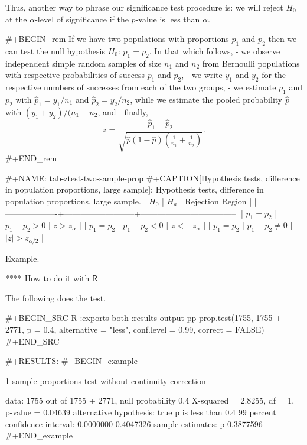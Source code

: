 Thus, another way to phrase our significance test procedure is: we
will reject \(H_{0}\) at the \(\alpha\)-level of significance if the
\(p\)-value is less than \(\alpha\).

#+BEGIN_rem
If we have two populations with proportions \(p_{1}\) and \(p_{2}\)
then we can test the null hypothesis \(H_{0}:\,p_{1} = p_{2}\). In
that which follows,
- we observe independent simple random samples of size \(n_{1}\) and
  \(n_{2}\) from Bernoulli populations with respective probabilities
  of success \(p_{1}\) and \(p_{2}\),
- we write \(y_{1}\) and \(y_{2}\) for the respective numbers of
  successes from each of the two groups,
- we estimate \(p_{1}\) and \(p_{2}\) with \(\hat{p}_{1} = y_{1}/n_{1}
  \) and \(\hat{p}_{2} = y_{2}/n_{2}\), while we estimate the pooled
  probability \(\hat{p}\) with \((y_{1} + y_{2})/(n_{1} + n_{2}\), and
- finally, \[z = \frac{\hat{p}_{1} - \hat{p}_{2}}{\sqrt{\hat{p}(1 - \hat{p})\left( \frac{1}{n_{1}} + \frac{1}{n_{2}} \right)}}. \]
#+END_rem


#+NAME: tab-ztest-two-sample-prop
#+CAPTION[Hypothesis tests, difference in population proportions, large sample]: Hypothesis tests, difference in population proportions, large sample.
| \(H_{0}\)         | \(H_{a}\)                | Rejection Region                  |
|-------------------+--------------------------+-----------------------------------|
| \(p_{1} = p_{2}\) | \(p_{1} - p_{2} > 0\)    | \(z > z_{\alpha}\)                |
| \(p_{1} = p_{2}\) | \(p_{1} - p_{2} < 0\)    | \(z < -z_{\alpha}\)               |
| \(p_{1} = p_{2}\) | \(p_{1} - p_{2} \neq 0\) | \( \vert z \vert > z_{\alpha/2}\) |


Example.



**** How to do it with \(\mathsf{R}\)

The following does the test.

#+BEGIN_SRC R :exports both :results output pp 
prop.test(1755, 1755 + 2771, p = 0.4, alternative = "less", 
          conf.level = 0.99, correct = FALSE)
#+END_SRC

#+RESULTS:
#+BEGIN_example
 
	1-sample proportions test without continuity correction

data:  1755 out of 1755 + 2771, null probability 0.4
X-squared = 2.8255, df = 1, p-value = 0.04639
alternative hypothesis: true p is less than 0.4
99 percent confidence interval:
 0.0000000 0.4047326
sample estimates:
        p 
0.3877596
#+END_example

